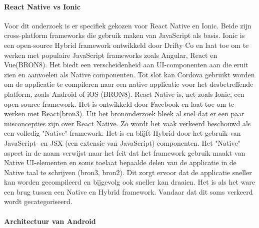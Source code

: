 \paragraph{React Native vs Ionic}
\newline
Voor dit onderzoek is er specifiek gekozen voor React Native en Ionic. Beide zijn cross-platform frameworks die gebruik maken van JavaScript als basis. Ionic is een open-source Hybrid framework ontwikkeld door Drifty Co en laat toe om te werken met populaire JavaScript frameworks zoals Angular, React en Vue(BRON8). Het biedt een verscheidenheid aan UI-componenten aan die eruit zien en aanvoelen als Native componenten. Tot slot kan Cordova gebruikt worden om de applicatie te compileren naar een native applicatie voor het desbetreffende platform, zoals Android of iOS (BRON8).
React Native is, net zoals Ionic, een open-source framework. Het is ontwikkeld door Facebook en laat toe om te werken met React(bron3). Uit het brononderzoek bleek al snel dat er een paar misconcepties zijn over React Native. Zo wordt het vaak verkeerd beschouwd als een volledig "Native" framework. Het is en blijft Hybrid door het gebruik van JavaScript- en JSX (een extensie van JavaScript) componenten. Het "Native" aspect in de naam verwijst naar het feit dat het framework gebruik maakt van Native UI-elementen en soms toelaat bepaalde delen van de applicatie in de Native taal te schrijven (bron3, bron2). Dit zorgt ervoor dat de applicatie sneller kan worden gecompileerd en bijgevolg ook sneller kan draaien. Het is als het ware een brug tussen een Native en Hybrid framework. Vandaar dat dit soms verkeerd wordt gecategoriseerd.

\paragraph{Architectuur van Android}
\newline

